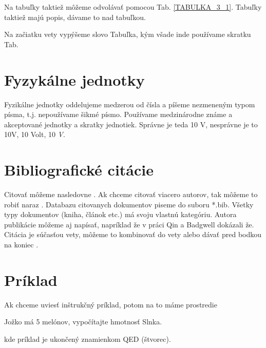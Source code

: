 Na tabuľky taktiež môžeme odvolávať pomocou Tab. \ref{TABULKA_3_1}. Tabuľky taktiež majú popis, dávame to nad tabuľkou. 

Na začiatku vety vypýšeme slovo Tabuľka, kým všade inde používame skratku Tab.

\section{Fyzykálne jednotky}

Fyzikálne jednotky oddelujeme medzerou od čísla a píšeme nezmeneným typom písma, t.j. nepoužívame šikmé písmo. Používame medzinárodne známe a akceptované jednotky a skratky jednotiek. Správne je teda 10 V, nesprávne je to 10V, 10 Volt, 10 \emph{V}. 


\section{Bibliografické citácie}

Citovať môžeme nasledovne \cite{Eykhoff84}. Ak chceme citovať viacero autorov, tak môžeme to robiť naraz \cite{Fontes00,Eykhoff84}. Databazu citovanych dokumentov piseme do suboru *.bib. Všetky typy dokumentov (kniha, článok etc.) má svoju vlastnú kategóriu. Autora publikácie môžeme aj napísať, napríklad že v práci Qin a Badgwell \cite{Qin99} dokázali že. Citácia je súčasťou vety, môžeme to kombinovať do vety \cite{Karny80} alebo dávať pred bodkou na koniec \cite{Far90}.

\section{Príklad}

Ak chceme uviesť inštrukčný príklad, potom na to máme prostredie
\begin{exmp}
Jožko má 5 melónov, vypočítajte hmotnosť Slnka.
\end{exmp}
kde príklad je ukončený znamienkom QED (štvorec).





